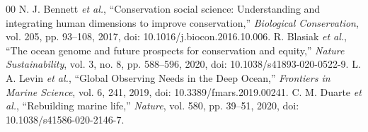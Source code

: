 \documentclass[conference]{IEEEtran}
\begin{document}
\begin{thebibliography}{00}
 N. J. Bennett \emph{et al.}, ``Conservation social science: Understanding and integrating human dimensions to improve conservation,'' \emph{Biological Conservation}, vol. 205, pp. 93--108, 2017, doi: 10.1016/j.biocon.2016.10.006.
 R. Blasiak \emph{et al.}, ``The ocean genome and future prospects for conservation and equity,'' \emph{Nature Sustainability}, vol. 3, no. 8, pp. 588--596, 2020, doi: 10.1038/s41893-020-0522-9.
 L. A. Levin \emph{et al.}, ``Global Observing Needs in the Deep Ocean,'' \emph{Frontiers in Marine Science}, vol. 6, 241, 2019, doi: 10.3389/fmars.2019.00241.
 C. M. Duarte \emph{et al.}, ``Rebuilding marine life,'' \emph{Nature}, vol. 580, pp. 39--51, 2020, doi: 10.1038/s41586-020-2146-7.
\end{thebibliography}
\end{document}
